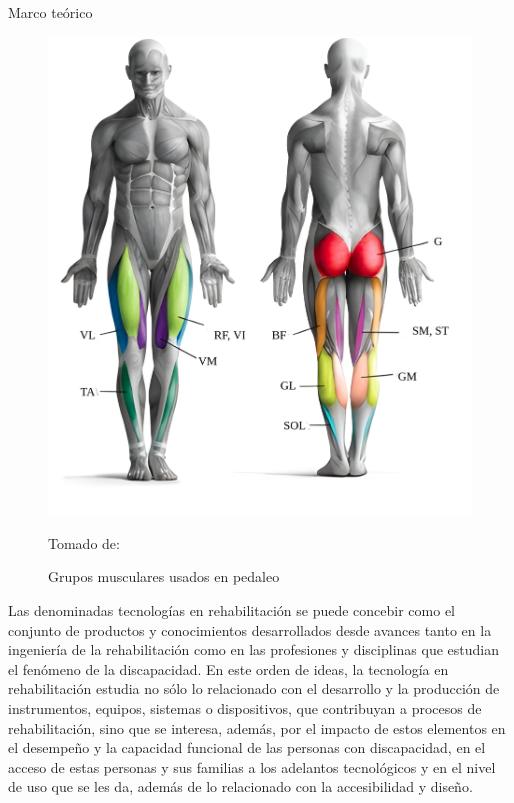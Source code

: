 \begin{thesischapter}{1} {Marco teórico}
    \begin{figure}[ht]
        \centering
        \includegraphics[scale=0.2]{images/musculegroups.png}
        \caption{Grupos musculares usados en pedaleo}
        Tomado de: ~\cite{Quémúsc72}
        \label{fig: musculegroups}
    \end{figure}

    \vspace{10pt}
    Las denominadas tecnologías en rehabilitación se puede concebir como el conjunto de productos y conocimientos desarrollados desde avances tanto en la ingeniería de la rehabilitación como en las profesiones y disciplinas que estudian el fenómeno de la discapacidad. En este orden de ideas, la tecnología en rehabilitación estudia no sólo lo relacionado con el desarrollo y la producción de instrumentos, equipos, sistemas o dispositivos, que contribuyan a procesos de rehabilitación, sino que se interesa, además, por el impacto de estos elementos en el desempeño y la capacidad funcional de las personas con discapacidad, en el acceso de estas personas y sus familias a los adelantos tecnológicos y en el nivel de uso que se les da, además de lo relacionado con la accesibilidad y diseño.\cite{matheus1990tecnologia}


\end{thesischapter}
